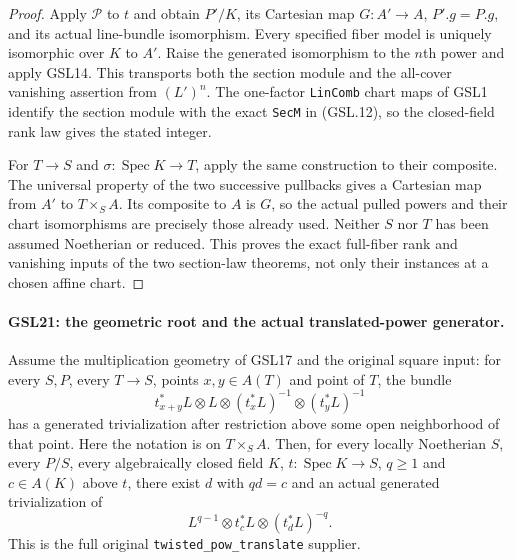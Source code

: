\documentclass[11pt,a4paper]{article}
\numberwithin{equation}{section}
\theoremstyle{remark}\newtheorem{remark}[theorem]{Remark}
\begin{document}
\begin{proof}
Apply $\mathcal P$ to $t$ and obtain $P'/K$, its Cartesian
map $G:A'\to A$, $P'.g=P.g$, and its actual line-bundle
isomorphism.  Every specified fiber model is uniquely
isomorphic over $K$ to $A'$.  Raise the generated isomorphism
to the $n$th power and apply GSL14.  This transports both
the section module and the all-cover vanishing assertion
from $(L')^n$.  The one-factor \texttt{Lin\allowbreak Comb} chart maps
of GSL1 identify the section module with the exact
\texttt{Sec\allowbreak M} in (GSL.12), so the closed-field rank law gives
the stated integer.

For $T\to S$ and $\sigma:\operatorname{Spec}K\to T$, apply
the same construction to their composite.  The universal
property of the two successive pullbacks gives a Cartesian
map from $A'$ to $T\times_S A$.  Its composite to $A$ is
$G$, so the actual pulled powers and their chart isomorphisms
are precisely those already used.  Neither $S$ nor $T$ has
been assumed Noetherian or reduced.  This proves the exact
full-fiber rank and vanishing inputs of the two section-law
theorems, not only their instances at a chosen affine chart.
\end{proof}

\paragraph{GSL21: the geometric root and the actual translated-power generator.}
\label{claim:GSL21}
Assume the multiplication geometry of GSL17 and the original
square input: for every $S,P$, every $T\to S$, points $x,y\in A(T)$
and point of $T$, the bundle
\[
 t_{x+y}^*L\otimes L\otimes(t_x^*L)^{-1}
                    \otimes(t_y^*L)^{-1}
 \tag{GSL.13}
\]
has a generated trivialization after restriction above some open
neighborhood of that point.  Here the notation is on $T\times_S A$.
Then, for every locally Noetherian $S$, every $P/S$, every
algebraically closed field $K$, $t:\operatorname{Spec}K\to S$,
$q\ge1$ and $c\in A(K)$ above $t$, there exist $d$ with $qd=c$
and an actual generated trivialization of
\[
 L^{q-1}\otimes t_c^*L\otimes(t_d^*L)^{-q}. \tag{GSL.14}
\]
This is the full original \texttt{twisted\_\allowbreak pow\_\allowbreak translate} supplier.
\end{document}
